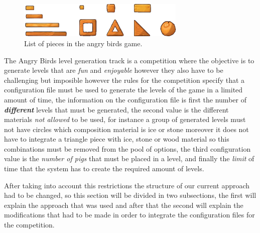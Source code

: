 \documentclass[conference]{IEEEtran}
\begin{document}
    \begin{figure}[htbp]
    \centerline{\includegraphics[width=80mm]{Images/list_pieces.png}}
    \caption{List of pieces in the angry birds game.}
    \label{piece_list}
    \end{figure}
    
    
    The Angry Birds level generation track is a competition where the objective is 
    to generate levels that are \textit{fun} and \textit{enjoyable} however they 
    also have to be challenging but imposible however the rules for the competition 
    specify that a configuration file must be used to
    generate the levels of the game in a limited amount of time, the information on
    the configuration file is first the number of \textbf{\textit{different}} levels
    that must be generated, the second value is the different materials \textit{not
    allowed} to be used, for instance a group of generated levels must not have
    circles which composition material is ice or stone moreover it does not have to
    integrate a triangle piece with ice, stone or wood material so this combinations
    must be removed from the pool of options, the third configuration value is the
    \textit{number of pigs} that must be placed in a level, and finally the
    \textit{limit} of time that the system has to create the required amount of
    levels.
    
    After taking into account this restrictions the structure of our current approach
    had to be changed, so this section will be divided in two subsections, the first
    will explain the approach that was used and after that the second will explain the
    modifications that had to be made in order to integrate the configuration files
    for the competition. 
    
\end{document}
